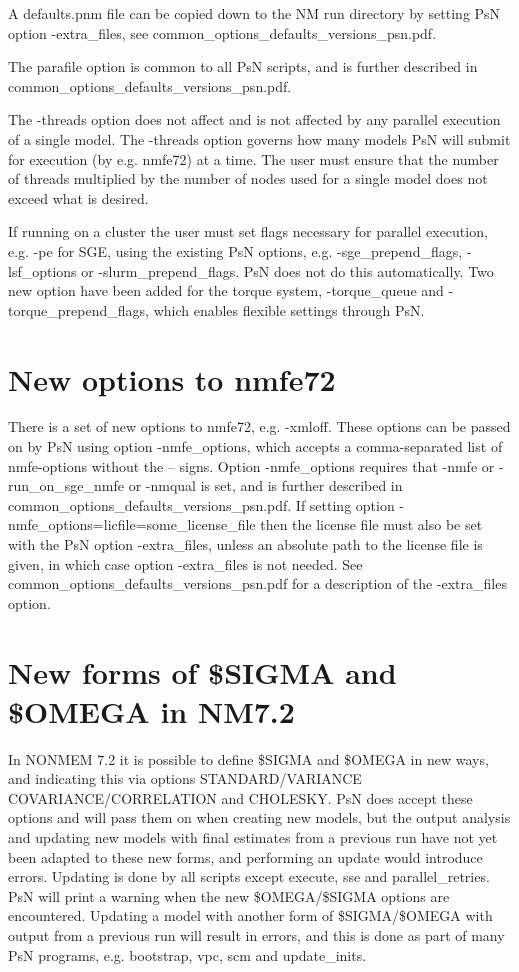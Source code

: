 \documentclass[a4paper,12pt]{article}
\begin{document}
A defaults.pnm file can be copied down to the NM run directory by setting PsN option -extra\_files, see common\_options\_defaults\_versions\_psn.pdf.

The parafile option is common to all PsN scripts, and is further described in common\_options\_defaults\_versions\_psn.pdf.

The -threads option does not affect and is not affected by any parallel execution of a single model. The -threads option governs how many models PsN will submit for execution (by e.g. nmfe72) at a time. The user must ensure that the number of threads multiplied by the number of nodes used for a single model does not exceed what is desired. 

If running on a cluster the user must set flags necessary for parallel execution, e.g. -pe for SGE, using the existing PsN options, e.g. -sge\_prepend\_flags, -lsf\_options or -slurm\_prepend\_flags. PsN does not do this automatically. Two new option have been added for the torque system, -torque\_queue and -torque\_prepend\_flags, which enables flexible settings through PsN.


\section{New options to nmfe72}

There is a set of new options to nmfe72, e.g. -xmloff. These options can be passed on by PsN using option -nmfe\_options, which accepts a comma-separated list of nmfe-options without the – signs. Option -nmfe\_options requires that -nmfe or -run\_on\_sge\_nmfe or -nmqual is set, and is further described in common\_options\_defaults\_versions\_psn.pdf. If setting option -nmfe\_options=licfile=some\_license\_file then the license file must also be set with the PsN option -extra\_files, unless an absolute path to the license file is given, in which case option -extra\_files is not needed. See common\_options\_defaults\_versions\_psn.pdf for a description of the -extra\_files option.

\section{New forms of \$SIGMA and \$OMEGA in NM7.2}

In NONMEM 7.2 it is possible to define \$SIGMA and \$OMEGA in new ways, and indicating this via options STANDARD/VARIANCE COVARIANCE/CORRELATION and CHOLESKY. PsN does accept these options and will pass them on when creating new models, but the output analysis and updating new models with final estimates from a previous run have not yet been adapted to these new forms, and performing an update would introduce errors. Updating is done by all scripts except execute, sse and parallel\_retries. PsN will print a warning when the new \$OMEGA/\$SIGMA options are encountered. Updating a model with another form of \$SIGMA/\$OMEGA with output from a previous run will result in errors, and this is done as part of many PsN programs, e.g. bootstrap, vpc, scm and update\_inits. 
\end{document}

